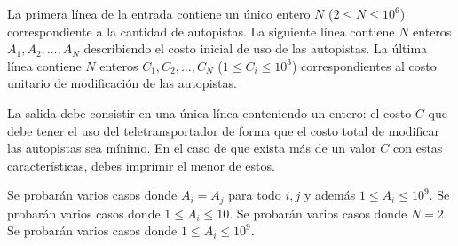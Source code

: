\documentclass{oci}
\begin{document}
\begin{inputDescription}
  La primera línea de la entrada contiene un único entero $N$ ($2 \leq N \leq
  10^6$) correspondiente a la cantidad de autopistas.
  La siguiente línea contiene $N$ enteros $A_1, A_2, \ldots, A_N$ describiendo el
  costo inicial de uso de las autopistas.
  La última línea contiene $N$ enteros $C_1, C_2, \ldots, C_N$ ($1 \leq C_i \leq
  10^3$) correspondientes al costo unitario de modificación de las autopistas.
\end{inputDescription}

\begin{outputDescription}
  La salida debe consistir en una única línea conteniendo un entero: el costo
  $C$ que debe tener el uso del teletransportador de forma que el costo total de
  modificar las autopistas sea mínimo.
  En el caso de que exista más de un valor $C$ con estas características, debes
  imprimir el menor de estos.
\end{outputDescription}

\begin{scoreDescription}
   Se probarán varios casos donde $A_i=A_j$ para todo $i,j$ y además
  $1 \leq A_i \leq 10^9$.
   Se probarán varios casos donde $1 \leq A_i \leq 10$.
   Se probarán varios casos donde $N=2$.
   Se probarán varios casos donde $1\leq A_i\leq 10^9$.
\end{scoreDescription}

\begin{sampleDescription}
\end{sampleDescription}
\end{document}
